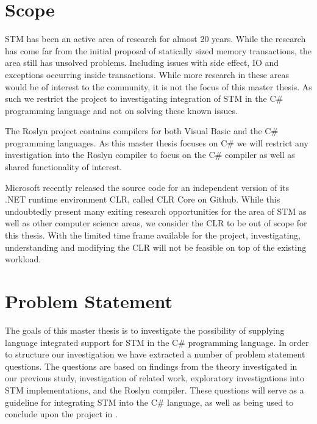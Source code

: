 \section{Scope}
\ac{STM} has been an active area of research for almost 20 years\cite{shavit1997software}. While the research has come far from the initial proposal of statically sized memory transactions, the area still has unsolved problems. Including issues with side effect, \ac{IO} and exceptions occurring inside transactions\cite{harris2005exceptions}. While more research in these areas would be of interest to the community, it is not the focus of this master thesis. As such we restrict the project to investigating integration of \ac{STM} in the C\# programming language and not on solving these known issues.

The Roslyn project contains compilers for both Visual Basic and the C\# programming languages\cite{roslyn}. As this master thesis focuses on C\# we will restrict any investigation into the Roslyn compiler to focus on the C\# compiler as well as shared functionality of interest. 

Microsoft recently released the source code for an independent version of its .NET runtime environment \acl{CLR}, called \ac{CLR} Core on Github\cite{coreclr}. While this undoubtedly present many exiting research opportunities for the area of \ac{STM} as well as other computer science areas, we consider the \ac{CLR} to be out of scope for this thesis. With the limited time frame available for the project, investigating, understanding and modifying the \ac{CLR} will not be feasible on top of the existing workload. 

\section{Problem Statement}
The goals of this master thesis is to investigate the possibility of supplying language integrated support for \ac{STM} in the C\# programming language. In order to structure our investigation we have extracted a number of problem statement questions. The questions are based on findings from the theory investigated in our previous study, investigation of related work, exploratory investigations into \ac{STM} implementations, and the Roslyn compiler. These questions will serve as a guideline for integrating \ac{STM} into the C\# language, as well as being used to conclude upon the project in .

